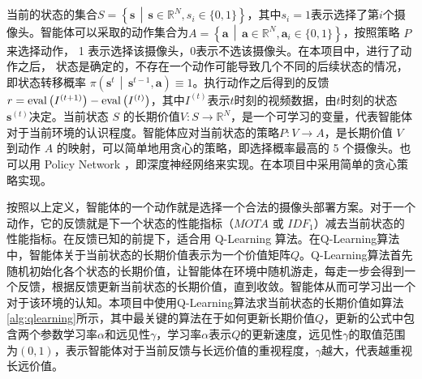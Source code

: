 当前的状态的集合$S=\left\{\boldsymbol{s}\,\middle\vert\,\boldsymbol{s}\in\mathbb{R}^{N}, s_i\in\{0, 1\}\right\}$，其中$s_i=1$表示选择了第$i$个摄像头。智能体可以采取的动作集合为$A=\left\{\boldsymbol{a}\,\middle\vert\,\boldsymbol{a}\in\mathbb{R}^N,\boldsymbol{a}_i \in \{0,1\}\right\}$，按照策略 $P$ 来选择动作， 1 表示选择该摄像头，0表示不选该摄像头。在本项目中，进行了动作之后， 状态是确定的，不存在一个动作可能导致几个不同的后续状态的情况，即状态转移概率 $\pi\left(\boldsymbol{s}^t\,\middle\vert\,\boldsymbol{s}^{t-1}, \boldsymbol{a}\right)\equiv1$。执行动作之后得到的反馈$r=\mathop{\rm{eval}}\left(I^{(t+1)}\right)-\mathop{\rm{eval}}\left(I^{(t)}\right)$，其中$I^{(t)}$表示$t$时刻的视频数据，由$t$时刻的状态$\boldsymbol{s}^{(t)}$决定。当前状态 $S$ 的长期价值$V:S\to \mathbb{R}^N$，是一个可学习的变量，代表智能体对于当前环境的认识程度。智能体应对当前状态的策略$P:V \to A$，是长期价值 $V$ 到动作 $A$ 的映射，可以简单地用贪心的策略，即选择概率最高的 5 个摄像头。也可以用 Policy Network ，即深度神经网络来实现。在本项目中采用简单的贪心策略实现。

按照以上定义，智能体的一个动作就是选择一个合法的摄像头部署方案。对于一个动作，它的反馈就是下一个状态的性能指标（$\mathit{MOTA}$ 或 $\mathit{IDF_1}$）减去当前状态的性能指标。在反馈已知的前提下，适合用 Q-Learning\cite{watkins1989learning} 算法。在Q-Learning算法中，智能体关于当前状态的长期价值表示为一个价值矩阵$Q$。Q-Learning算法首先随机初始化各个状态的长期价值，让智能体在环境中随机游走，每走一步会得到一个反馈，根据反馈更新当前状态的长期价值，直到收敛。智能体从而可学习出一个对于该环境的认知。本项目中使用Q-Learning算法求当前状态的长期价值如算法\ref{alg:qlearning}所示，其中最关键的算法在于如何更新长期价值$Q$，更新的公式中包含两个参数学习率$\alpha$和远见性$\gamma$，学习率$\alpha$表示$Q$的更新速度，远见性$\gamma$的取值范围为$(0, 1)$，表示智能体对于当前反馈与长远价值的重视程度，$\gamma$越大，代表越重视长远价值。

